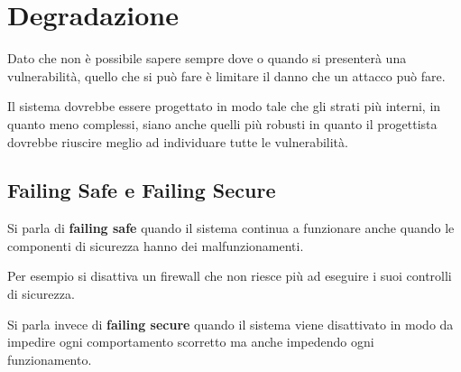 \section{Degradazione}
Dato che non è possibile sapere sempre dove o quando si presenterà una vulnerabilità, quello che si può fare è
limitare il danno che un attacco può fare.

Il sistema dovrebbe essere progettato in modo tale che gli strati più interni, in quanto meno complessi, siano
anche quelli più robusti in quanto il progettista dovrebbe riuscire meglio ad individuare tutte le vulnerabilità.

\subsection{Failing Safe e Failing Secure}
Si parla di \textbf{failing safe} quando il sistema continua a funzionare anche quando le componenti di sicurezza
hanno dei malfunzionamenti.

Per esempio si disattiva un firewall che non riesce più ad eseguire i suoi controlli di sicurezza.

Si parla invece di \textbf{failing secure} quando il sistema viene disattivato in modo da impedire ogni
comportamento scorretto ma anche impedendo ogni funzionamento.